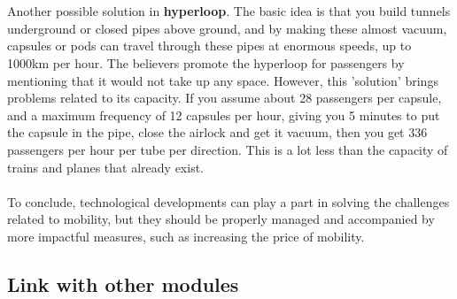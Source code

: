 \documentclass[../summary.tex]{subfiles}
\begin{document}
	 \\\\
	 Another possible solution in \textbf{hyperloop}. The basic idea is that you build tunnels underground or closed pipes above ground, and by making these almost vacuum, capsules or pods can travel through these pipes at enormous speeds, up to 1000km per hour. The believers promote the hyperloop for passengers by mentioning that it would not take up any space. However, this 'solution' brings problems related to its capacity. If you assume about 28 passengers per capsule, and a maximum frequency of 12 capsules per hour, giving you 5 minutes to put the capsule in the pipe, close the airlock and get it vacuum, then you get 336 passengers per hour per tube per direction. This is a lot less than the capacity of trains and planes that already exist. 
	 \\\\
	 To conclude, technological developments can play a part in solving the challenges related to mobility, but they should be properly managed and accompanied by more impactful measures, such as increasing the price of mobility.
	
	\subsection{Link with other modules}
	
\end{document}
